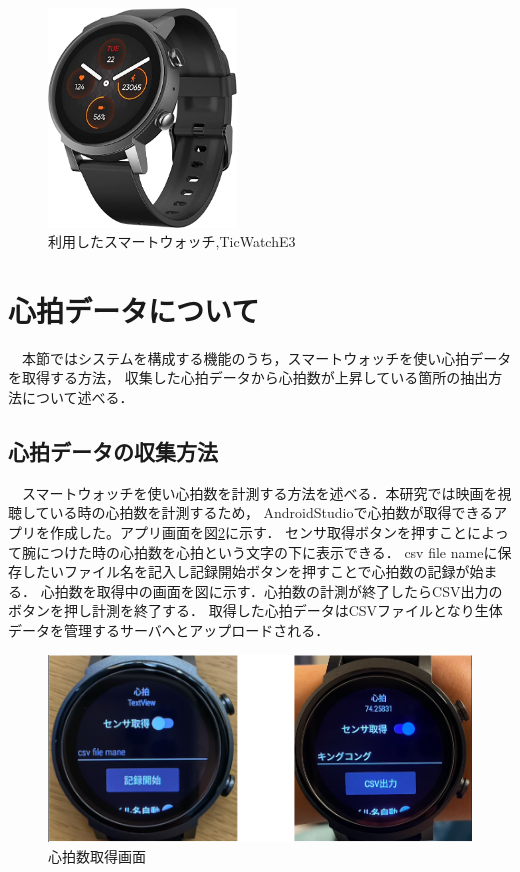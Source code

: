 \begin{figure}[H]
    \centering
    \includegraphics[width=5cm]{images/chapter3/watch.jpg}
    \caption{利用したスマートウォッチ,TicWatchE3}
    \label{watche3}
\end{figure}


\section{心拍データについて}

　本節ではシステムを構成する機能のうち，スマートウォッチを使い心拍データを取得する方法，
収集した心拍データから心拍数が上昇している箇所の抽出方法について述べる．

\subsection{心拍データの収集方法}

　スマートウォッチを使い心拍数を計測する方法を述べる．本研究では映画を視聴している時の心拍数を計測するため，
AndroidStudioで心拍数が取得できるアプリを作成した。アプリ画面を図\ref{bpmget}に示す．
センサ取得ボタンを押すことによって腕につけた時の心拍数を心拍という文字の下に表示できる．
csv file nameに保存したいファイル名を記入し記録開始ボタンを押すことで心拍数の記録が始まる．
心拍数を取得中の画面を図に示す．心拍数の計測が終了したらCSV出力のボタンを押し計測を終了する．
取得した心拍データはCSVファイルとなり生体データを管理するサーバへとアップロードされる．

\begin{figure}[tbh]
    \centering
    \includegraphics[width=15cm]{images/chapter3/watchgazou.png}
    \caption{心拍数取得画面}
    \label{bpmget}
\end{figure}


